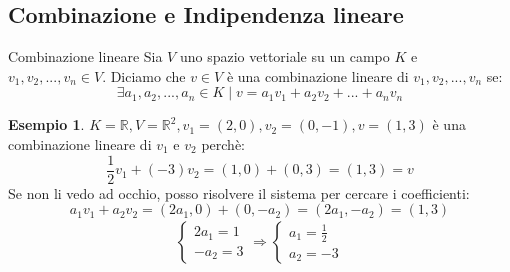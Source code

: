 \documentclass[a4paper]{article}
\theoremstyle{definition}
\newtheorem*{es}{Esempio}
\newtheorem*{prop}{Proposizione}
\begin{document}

\subsection{Combinazione e Indipendenza lineare}

\begin{deff}{Combinazione lineare}{}
	Sia $V$ uno spazio vettoriale su un campo $K$ e $v_1, v_2, ..., v_n \in V$.
	Diciamo che $v \in V$ è una combinazione lineare di $v_1, v_2, ..., v_n$ se:
	\[ \exists a_1, a_2, ..., a_n \in K \mid v = a_1v_1 + a_2v_2 + ... + a_nv_n \]
\end{deff}
\begin{es}
	$K = \mathbb{R}, V = \mathbb{R}^2, v_1 = (2, 0), v_2 = (0, -1), v = (1, 3)$ è una combinazione lineare di $v_1$ e $v_2$ perchè:
	\[ \frac{1}{2}v_1 + (-3)v_2 = (1, 0) + (0, 3) = (1, 3) = v \]
	Se non li vedo ad occhio, posso risolvere il sistema per cercare i coefficienti:
	\[ a_1v_1 + a_2v_2 = (2a_1, 0) + (0, -a_2) = (2a_1, -a_2) = (1, 3) \]
	\begin{align*}
		\begin{cases}
			2a_1 = 1 \\
			-a_2 = 3
		\end{cases}
		\Rightarrow
		\begin{cases}
			a_1 = \frac{1}{2} \\
			a_2 = -3
		\end{cases}
	\end{align*}
\end{es}
\end{document}
